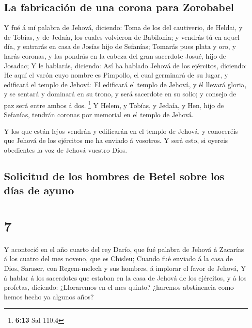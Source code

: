 \hypertarget{la-fabricaciuxf3n-de-una-corona-para-zorobabel}{%
\subsection{La fabricación de una corona para
Zorobabel}\label{la-fabricaciuxf3n-de-una-corona-para-zorobabel}}

 Y fué á mí palabra de Jehová, diciendo: 
Toma de los del cautiverio, de Heldai, y de Tobías, y de Jedaía, los
cuales volvieron de Babilonia; y vendrás tú en aquel día, y entrarás en
casa de Josías hijo de Sefanías;  Tomarás pues plata y
oro, y harás coronas, y las pondrás en la cabeza del gran sacerdote
Josué, hijo de Josadac;  Y le hablarás, diciendo: Así ha
hablado Jehová de los ejércitos, diciendo: He aquí el varón cuyo nombre
es Pimpollo, el cual germinará de su lugar, y edificará el templo de
Jehová:  El edificará el templo de Jehová, y él llevará
gloria, y se sentará y dominará en su trono, y será sacerdote en su
solio; y consejo de paz será entre ambos á dos. \footnote{\textbf{6:13}
  Sal 110,4}  Y Helem, y Tobías, y Jedaía, y Hen, hijo de
Sefanías, tendrán coronas por memorial en el templo de Jehová.

 Y los que están lejos vendrán y edificarán en el templo
de Jehová, y conoceréis que Jehová de los ejércitos me ha enviado á
vosotros. Y será esto, si oyereis obedientes la voz de Jehová vuestro
Dios.

\hypertarget{solicitud-de-los-hombres-de-betel-sobre-los-duxedas-de-ayuno}{%
\subsection{Solicitud de los hombres de Betel sobre los días de
ayuno}\label{solicitud-de-los-hombres-de-betel-sobre-los-duxedas-de-ayuno}}

\hypertarget{section-6}{%
\section{7}\label{section-6}}

 Y aconteció en el año cuarto del rey Darío, que fué
palabra de Jehová á Zacarías á los cuatro del mes noveno, que es
Chisleu;  Cuando fué enviado á la casa de Dios, Saraser,
con Regem-melech y sus hombres, á implorar el favor de Jehová,
 Y á hablar á los sacerdotes que estaban en la casa de
Jehová de los ejércitos, y á los profetas, diciendo: ¿Lloraremos en el
mes quinto? ¿haremos abstinencia como hemos hecho ya algunos años?

